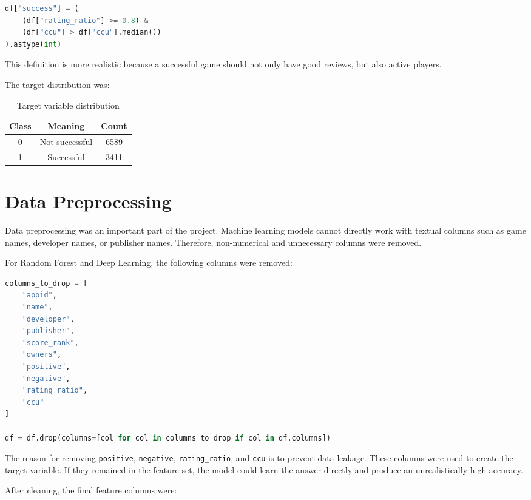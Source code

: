 \documentclass[12pt,a4paper]{article}
\begin{document}
\begin{lstlisting}[language=Python]
df["success"] = (
    (df["rating_ratio"] >= 0.8) &
    (df["ccu"] > df["ccu"].median())
).astype(int)
\end{lstlisting}

This definition is more realistic because a successful game should not only have good reviews, but also active players.

The target distribution was:

\begin{table}[H]
\centering
\begin{tabular}{ccc}
\toprule
\textbf{Class} & \textbf{Meaning} & \textbf{Count} \\
\midrule
0 & Not successful & 6589 \\
1 & Successful & 3411 \\
\bottomrule
\end{tabular}
\caption{Target variable distribution}
\end{table}

\section{Data Preprocessing}

Data preprocessing was an important part of the project. Machine learning models cannot directly work with textual columns such as game names, developer names, or publisher names. Therefore, non-numerical and unnecessary columns were removed.

For Random Forest and Deep Learning, the following columns were removed:

\begin{lstlisting}[language=Python]
columns_to_drop = [
    "appid",
    "name",
    "developer",
    "publisher",
    "score_rank",
    "owners",
    "positive",
    "negative",
    "rating_ratio",
    "ccu"
]

df = df.drop(columns=[col for col in columns_to_drop if col in df.columns])
\end{lstlisting}

The reason for removing \texttt{positive}, \texttt{negative}, \texttt{rating\_ratio}, and \texttt{ccu} is to prevent data leakage. These columns were used to create the target variable. If they remained in the feature set, the model could learn the answer directly and produce an unrealistically high accuracy.

After cleaning, the final feature columns were:
\end{document}
